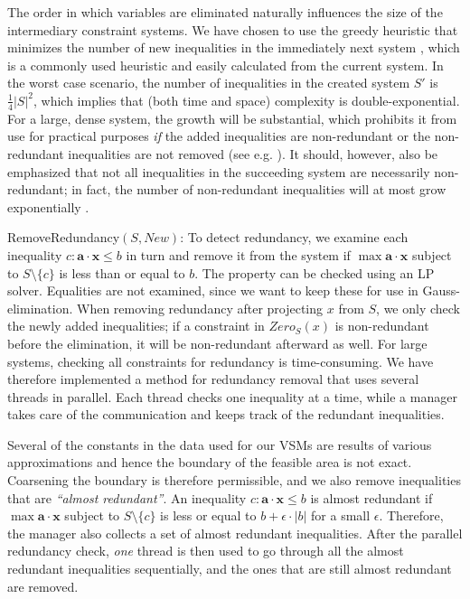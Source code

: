 \documentclass{llncs}
\newcommand{\Pos}{\mathit{Pos}}
\newcommand{\Neg}{\mathit{Neg}}
\newcommand{\mi}{\mathit}
\newcommand{\ve}{\mathbf}
\begin{document}
The order in which variables are eliminated naturally influences the size of the intermediary constraint systems. We have chosen to use the greedy heuristic {that minimizes the number of new inequalities in the immediately next system \cite{duffin74}}, which is a commonly used heuristic and easily calculated from the current system. %
In the worst case scenario, %
the number of inequalities in the created system $S'$ is $\frac{1}{4}|S|^2$, which implies that (both time and space) complexity is double-exponential. For a large, dense system, the growth will be substantial, which prohibits it from use for practical purposes \emph{if} the added inequalities are non-redundant or the non-redundant inequalities are not removed ({see e.g. \cite{lukatskii08}}). It should, however, also be emphasized that not all inequalities in the succeeding system are necessarily non-redundant; in fact, the number of non-redundant inequalities will at most grow exponentially \cite{monniaux10}.

{{\sc RemoveRedundancy}$(S,\mathit{New})$:} To detect redundancy, we examine each inequality $c: \ve{a}\cdot \ve{x}\leq b$ in turn and remove it from the system if $\max \ve{a}\cdot \ve{x}$ subject to $S\setminus\{c\}$ is less than or equal to $b$. The property can be checked using an LP solver. Equalities are not examined, since we want to keep these for use in Gauss-elimination. When removing redundancy after projecting $x$ from $S$, we only check the newly added inequalities; if a constraint in $\mi{Zero}_S(x)$ is non-redundant before the elimination, it will be non-redundant afterward as well. 
%
For large systems, checking all constraints for redundancy is time-consuming. We have therefore implemented a method for redundancy removal that uses several threads in parallel. Each thread checks one inequality at a time, while a manager takes care of the communication and keeps track of the redundant inequalities. 

Several of the constants in the data used for our VSMs are results of various approximations and hence the boundary of the feasible area is not exact. Coarsening the boundary is therefore permissible, and we also remove inequalities that are \emph{``almost redundant''}. An inequality $c: \ve{a}\cdot\ve{x}\leq b$ is almost redundant if $\max \ve{a}\cdot\ve{x}$ subject to $S\setminus\{c\}$ is less or equal to $b + \epsilon\cdot |b|$ for a small $\epsilon$. 
Therefore, the manager also collects a set of almost redundant inequalities. After the parallel redundancy check, \emph{one} thread is then used to go through all the almost redundant inequalities sequentially, and the ones that are still almost redundant are removed. 
\end{document}
